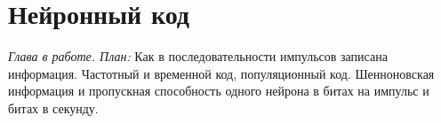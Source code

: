 \chapter{Нейронный код}
\label{sec:coding}

\emph{Глава в работе. План:} Как в последовательности импульсов записана информация. Частотный и временной код, популяционный код. Шенноновская информация и пропускная способность одного нейрона в битах на импульс и битах в секунду.
